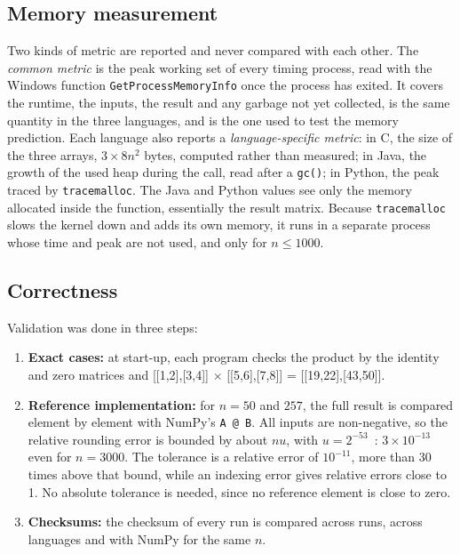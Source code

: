 \documentclass[12pt,a4paper]{article}
\begin{document}
\subsection{Memory measurement}

Two kinds of metric are reported and never compared with each other. The
\textit{common metric} is the peak working set of every timing process, read with the
Windows function \texttt{GetProcessMemoryInfo} once the process has exited. It covers the
runtime, the inputs, the result and any garbage not yet collected, is the same quantity
in the three languages, and is the one used to test the memory prediction. Each
language also reports a \textit{language-specific metric}: in C, the size of the three
arrays, $3 \times 8n^2$ bytes, computed rather than measured; in Java, the growth of the
used heap during the call, read after a \texttt{gc()}; in Python, the peak traced by
\texttt{tracemalloc}. The Java and Python values see only the memory allocated inside the
function, essentially the result matrix. Because \texttt{tracemalloc} slows the kernel
down and adds its own memory, it runs in a separate process whose time and peak are not
used, and only for $n \le 1000$.

\subsection{Correctness}

Validation was done in three steps:
\begin{enumerate}
    \item \textbf{Exact cases:} at start-up, each program checks the product by the
    identity and zero matrices and [[1,2],[3,4]] $\times$ [[5,6],[7,8]] =
    [[19,22],[43,50]].
    \item \textbf{Reference implementation:} for $n = 50$ and $257$, the full result is
    compared element by element with NumPy's \texttt{A @ B}. All inputs are non-negative,
    so the relative rounding error is bounded by about $n u$, with
    $u = 2^{-53}$~\cite{goldberg1991}: $3 \times 10^{-13}$ even for $n = 3000$. The
    tolerance is a relative error of $10^{-11}$, more than 30 times above that bound,
    while an indexing error gives relative errors close to 1. No absolute tolerance is
    needed, since no reference element is close to zero.
    \item \textbf{Checksums:} the checksum of every run is compared across runs, across
    languages and with NumPy for the same $n$.
\end{enumerate}
\end{document}
